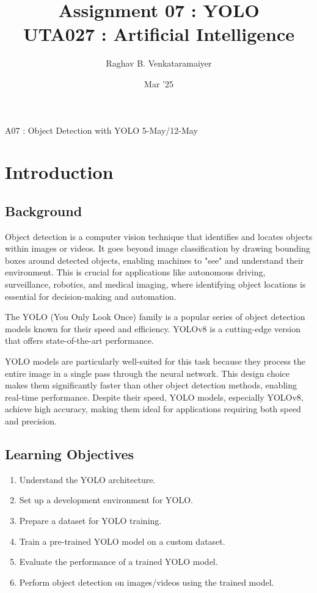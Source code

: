 \documentclass[11pt]{article}
\author{Raghav B. Venkataramaiyer}
\date{Mar '25}
\title{Assignment 07 : YOLO\\\medskip
\large UTA027 : Artificial Intelligence}
\begin{document}
\maketitle
A07 : Object Detection with YOLO
5-May/12-May


\section{Introduction}
\label{sec:org8d55e70}
\subsection{Background}
\label{sec:orgfb45e1b}

Object detection is a computer vision technique that
identifies and locates objects within images or
videos.   It goes beyond image classification by drawing
bounding boxes around detected objects, enabling
machines to "see" and understand their
environment.   This is crucial for applications like
autonomous driving, surveillance, robotics, and medical
imaging, where identifying object locations is
essential for decision-making and automation.

The YOLO (You Only Look Once) family is a popular
series of object detection models known for their speed
and efficiency.  YOLOv8 is a cutting-edge version that
offers state-of-the-art performance.

YOLO models are particularly well-suited for this task
because they process the entire image in a single pass
through the neural network.  This design choice makes
them significantly faster than other object detection
methods, enabling real-time performance.  Despite their
speed, YOLO models, especially YOLOv8, achieve high
accuracy, making them ideal for applications requiring
both speed and precision.

\subsection{Learning Objectives}
\label{sec:org4192d54}
\begin{enumerate}
\item Understand the YOLO architecture.
\item Set up a development environment for YOLO.
\item Prepare a dataset for YOLO training.
\item Train a pre-trained YOLO model on a custom dataset.
\item Evaluate the performance of a trained YOLO model.
\item Perform object detection on images/videos using the
trained model.
\end{enumerate}
\end{document}
